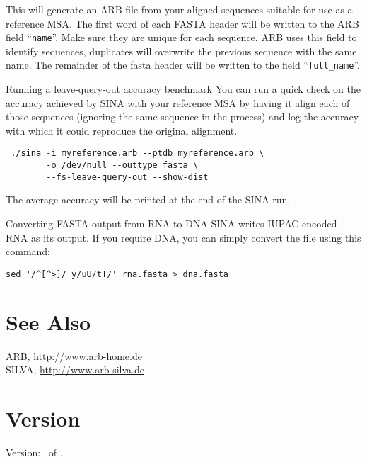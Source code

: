 \documentclass[english,a4paper]{article}
\renewcommand{\URL}[1]{\url{#1}}
\begin{document}
\begin{Description}
This will generate an ARB file from your aligned sequences suitable 
for use as a reference MSA. The first word of each FASTA header 
will be written to the ARB field ``\texttt{name}''. Make sure they 
are unique for each sequence. ARB uses this field to identify 
sequences, duplicates will overwrite the previous sequence with 
the same name. The remainder of the fasta header will be written
to the field ``\texttt{full\_name}''. 

\item[Running a leave-query-out accuracy benchmark]
You can run a quick check on the accuracy achieved by SINA with 
your reference MSA by having it align each of those sequences 
(ignoring the same sequence in the process) and log the 
accuracy with which it could reproduce the original alignment.

\begin{verbatim}
 ./sina -i myreference.arb --ptdb myreference.arb \
        -o /dev/null --outtype fasta \
        --fs-leave-query-out --show-dist
\end{verbatim}

The average accuracy will be printed at the end of the SINA run.
\item[Converting FASTA output from RNA to DNA]
SINA writes IUPAC encoded RNA as its output. If you require
DNA, you can simply convert the file using this command:

\begin{verbatim}
sed '/^[^>]/ y/uU/tT/' rna.fasta > dna.fasta
\end{verbatim}
\end{Description}
\section{See Also}
ARB, \URL{http://www.arb-home.de}\\
SILVA, \URL{http://www.arb-silva.de}
\section{Version}
Version: \Version\ of \Date.
\end{document}
